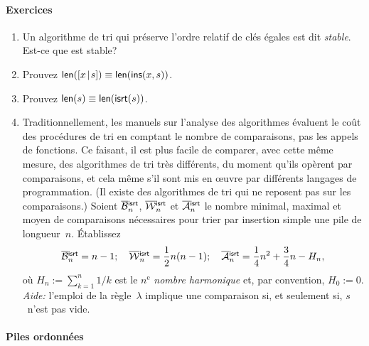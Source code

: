 \paragraph{Exercices}
\begin{enumerate}

  \item Un algorithme de tri qui préserve l'ordre relatif de clés
    égales est dit \emph{stable}. Est-ce que
     est stable?

  \item Prouvez \(\textsf{len}([{x}\!\mid\!{s}]) \equiv
    \textsf{len}(\textsf{ins}(x,s))\).

  \item Prouvez \(\textsf{len}(s) \equiv \textsf{len}(\textsf{isrt}(s))\).

  \item Traditionnellement, les manuels sur l'analyse des algorithmes
    évaluent le coût des procédures de tri en comptant le nombre de
    comparaisons, pas les appels de fonctions. Ce faisant, il est plus
    facile de comparer, avec cette même mesure, des algorithmes de tri
    très différents, du moment qu'ils opèrent par comparaisons, et
    cela même s'il sont mis en œuvre par différents langages de
    programmation. (Il existe des algorithmes de tri qui ne reposent
    pas sur les comparaisons.) Soient
    \(\OB{\fun{isrt}}{n}\),
    \(\OW{\fun{isrt}}{n}\) et
    \(\OM{\fun{isrt}}{n}\) le
    nombre minimal, maximal et moyen de comparaisons nécessaires pour
    trier par insertion simple une pile de longueur~\(n\). Établissez
    \begin{equation*}
      \OB{\fun{isrt}}{n} = n - 1; \quad
      \OW{\fun{isrt}}{n} = \frac{1}{2}n(n - 1); \quad
      \OM{\fun{isrt}}{n} = \frac{1}{4}n^2 + \frac{3}{4}n - H_n,
    \end{equation*}
    où \(H_n := \sum_{k=1}^n{1/k}\) est le \(n^\text{e}\) \emph{nombre
      harmonique} et, par convention,
    \(H_0 := 0\). \emph{Aide:} l'emploi de la règle~\(\lambda\)
    implique une comparaison si, et seulement si, \(s\)~n'est pas
    vide.
\end{enumerate}

\paragraph{Piles ordonnées}

